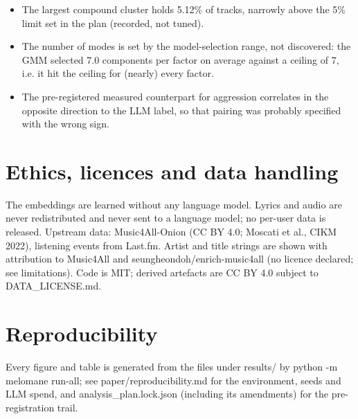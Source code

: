 \documentclass[11pt,a4paper]{article}
\begin{document}
\begin{itemize}
\item The largest compound cluster holds 5.12\% of tracks, narrowly above the 5\% limit set in the plan (recorded, not tuned).
\item The number of modes is set by the model-selection range, not discovered: the GMM selected 7.0 components per factor on average against a ceiling of 7, i.e. it hit the ceiling for (nearly) every factor.
\item The pre-registered measured counterpart for aggression correlates in the opposite direction to the LLM label, so that pairing was probably specified with the wrong sign.
\end{itemize}

\section*{Ethics, licences and data handling}
The embeddings are learned without any language model. Lyrics and audio are never redistributed and never sent to a language model; no per-user data is released. Upstream data: Music4All-Onion (CC BY 4.0; Moscati et al., CIKM 2022), listening events from Last.fm. Artist and title strings are shown with attribution to Music4All and seungheondoh/enrich-music4all (no licence declared; see limitations). Code is MIT; derived artefacts are CC BY 4.0 subject to DATA\_LICENSE.md.

\section*{Reproducibility}
Every figure and table is generated from the files under results/ by python -m melomane run-all; see paper/reproducibility.md for the environment, seeds and LLM spend, and analysis\_plan.lock.json (including its amendments) for the pre-registration trail.
\end{document}
